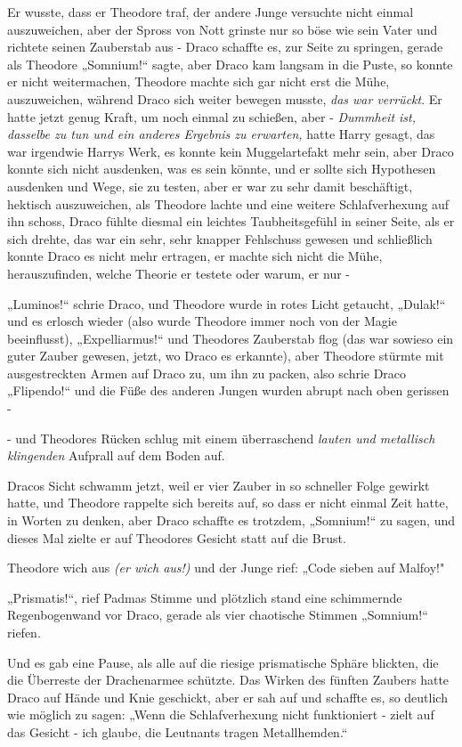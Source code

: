 {Er wusste, dass er Theodore traf, der andere Junge versuchte nicht einmal auszuweichen, aber der Spross von Nott grinste nur so böse wie sein Vater und richtete seinen Zauberstab aus - Draco schaffte es, zur Seite zu springen, gerade als Theodore „Somnium!“ sagte, aber Draco kam langsam in die Puste, so konnte er nicht weitermachen, Theodore machte sich gar nicht erst die Mühe, auszuweichen, während Draco sich weiter bewegen musste, \emph{das war verrückt}. Er hatte jetzt genug Kraft, um noch einmal zu schießen, aber - \emph{Dummheit ist, dasselbe zu tun und ein anderes Ergebnis zu erwarten,} hatte Harry gesagt, das war irgendwie Harrys Werk, es konnte kein Muggelartefakt mehr sein, aber Draco konnte sich nicht ausdenken, was es sein könnte, und er sollte sich Hypothesen ausdenken und Wege, sie zu testen, aber er war zu sehr damit beschäftigt, hektisch auszuweichen, als Theodore lachte und eine weitere Schlafverhexung auf ihn schoss, Draco fühlte diesmal ein leichtes Taubheitsgefühl in seiner Seite, als er sich drehte, das war ein sehr, sehr knapper Fehlschuss gewesen und schließlich konnte Draco es nicht mehr ertragen, er machte sich nicht die Mühe, herauszufinden, welche Theorie er testete oder warum, er nur -

„Luminos!“ schrie Draco, und Theodore wurde in rotes Licht getaucht, „Dulak!“ und es erlosch wieder (also wurde Theodore immer noch von der Magie beeinflusst), „Expelliarmus!“ und Theodores Zauberstab flog (das war sowieso ein guter Zauber gewesen, jetzt, wo Draco es erkannte), aber Theodore stürmte mit ausgestreckten Armen auf Draco zu, um ihn zu packen, also schrie Draco „Flipendo!“ und die Füße des anderen Jungen wurden abrupt nach oben gerissen -

- und Theodores Rücken schlug mit einem überraschend \emph{lauten und metallisch klingenden} Aufprall auf dem Boden auf.

Dracos Sicht schwamm jetzt, weil er vier Zauber in so schneller Folge gewirkt hatte, und Theodore rappelte sich bereits auf, so dass er nicht einmal Zeit hatte, in Worten zu denken, aber Draco schaffte es trotzdem, „Somnium!“ zu sagen, und dieses Mal zielte er auf Theodores Gesicht statt auf die Brust.

Theodore wich aus \emph{(er wich aus!)} und der Junge rief: „Code sieben auf Malfoy!"

„Prismatis!“, rief Padmas Stimme und plötzlich stand eine schimmernde Regenbogenwand vor Draco, gerade als vier chaotische Stimmen „Somnium!“ riefen.

Und es gab eine Pause, als alle auf die riesige prismatische Sphäre blickten, die die Überreste der Drachenarmee schützte. Das Wirken des fünften Zaubers hatte Draco auf Hände und Knie geschickt, aber er sah auf und schaffte es, so deutlich wie möglich zu sagen: „Wenn die Schlafverhexung nicht funktioniert - zielt auf das Gesicht - ich glaube, die Leutnants tragen Metallhemden.“

}
